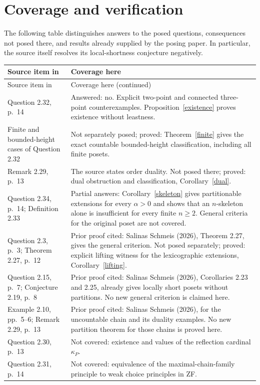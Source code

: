 \documentclass[11pt]{article}
\begin{document}
\section{Coverage and verification}
The following table distinguishes answers to the posed questions, consequences
not posed there, and results already supplied by the posing paper. In particular,
the source itself resolves its local-shortness conjecture negatively.
{\small
\begin{longtable}{@{}>{\raggedright\arraybackslash}p{.27\linewidth}>{\raggedright\arraybackslash}p{.66\linewidth}@{}}
\toprule
Source item in \cite{salinas} & Coverage here\\\midrule
\endfirsthead
\toprule
Source item in \cite{salinas} & Coverage here (continued)\\\midrule
\endhead
Question 2.32, p.~14 & Answered: no. Explicit two-point and connected
three-point counterexamples. Proposition~\ref{existence} proves existence
without leastness.\\
Finite and bounded-height cases of Question 2.32 & Not separately posed;
proved: Theorem~\ref{finite} gives the exact countable bounded-height
classification, including all finite posets.\\
Remark 2.29, p.~13 & The source states order duality. Not posed there;
proved: dual obstruction and classification, Corollary~\ref{dual}.\\
Question 2.34, p.~14; Definition 2.33 & Partial answers: Corollary~\ref{skeleton}
gives partitionable extensions for every $\alpha>0$ and shows that an
$n$-skeleton alone is insufficient for every finite $n\geq2$. General
criteria for the original poset are not covered.\\
Question 2.3, p.~3; Theorem 2.27, p.~12 & Prior proof cited: Salinas Schmeis
(2026), Theorem 2.27, gives the general criterion. Not posed separately;
proved: explicit lifting witness for the lexicographic extensions,
Corollary~\ref{lifting}.\\
Question 2.15, p.~7; Conjecture 2.19, p.~8 & Prior proof cited: Salinas Schmeis
(2026), Corollaries 2.23 and 2.25, already gives locally short posets without
partitions. No new general criterion is claimed here.\\
Example 2.10, pp.~5--6; Remark 2.29, p.~13 & Prior proof cited: Salinas
Schmeis (2026), for the uncountable chain and its duality examples.
No new partition theorem for those chains is proved here.\\
Question 2.30, p.~13 & Not covered: existence and values of the reflection
cardinal $\kappa_P$.\\
Question 2.31, p.~14 & Not covered: equivalence of the maximal-chain-family
principle to weak choice principles in ZF.\\
\bottomrule
\end{longtable}}
\end{document}
